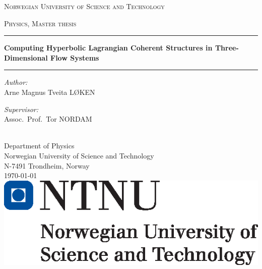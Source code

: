 \begingroup
{}
\begin{titlingpage}
    \begin{center}
        \vspace*{.04\textheight}
        {\scshape \fontsize{17pt}{17pt}\selectfont Norwegian University of Science and Technology\par}%
        \vspace{0.75cm}\textsc{\large Physics, Master thesis}\vspace{0.4cm}

        \hrule\phantom{}\vspace{0.4cm}
        {\LARGE \bfseries Computing Hyperbolic Lagrangian Coherent Structures
            in Three-Dimensional Flow Systems
        \par}\vspace{0.8cm}
        \hrule\phantom{}\vspace{1cm}

        \begin{minipage}[t]{0.45\textwidth}
            \begin{flushleft}\large
                \emph{Author:}\\
                Arne Magnus Tveita LØKEN
            \end{flushleft}
        \end{minipage}
        \begin{minipage}[t]{0.45\textwidth}
            \begin{flushright}\large
                \emph{Supervisor:}\\
                Assoc.\ Prof.\ Tor NORDAM
            \end{flushright}
        \end{minipage}\\[2cm]


        \large {Department of Physics\\%
            Norwegian University of Science and Technology\\%
        N-7491 Trondheim, Norway}\\[1.5cm]
        \begingroup
        {\large \today}\\[0.5cm]
        \endgroup
        \includegraphics{titlepage/hovedlogo_eng.eps}
    \end{center}
\end{titlingpage}
\endgroup
\cleartorecto
